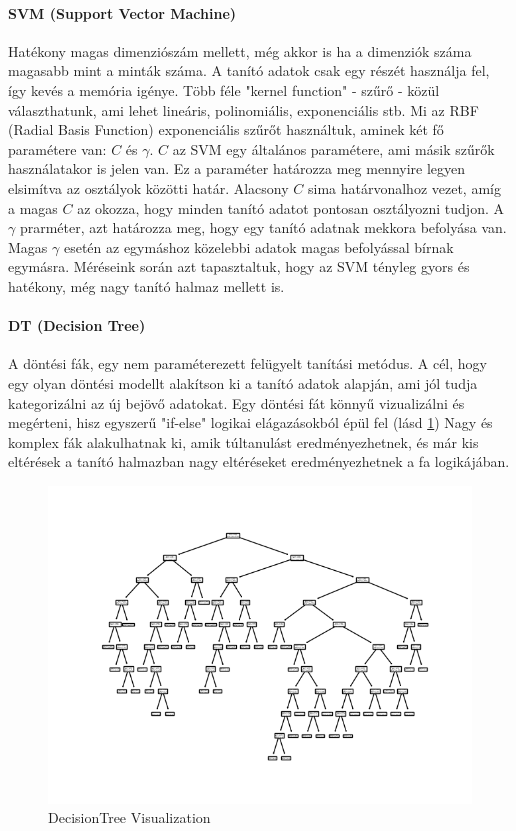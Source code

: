 \documentclass[acmtog, authorversion]{acmart}
\begin{document}
\paragraph{SVM (Support Vector Machine)} Hatékony magas dimenziószám mellett, még akkor is ha a dimenziók száma magasabb mint a minták száma. A tanító adatok
csak egy részét használja fel, így kevés a memória igénye. Több féle "kernel function" - szűrő - közül választhatunk, ami lehet lineáris, polinomiális, exponenciális stb.
Mi az RBF (Radial Basis Function) exponenciális szűrőt használtuk, aminek két fő paramétere van: $C$ és $\gamma$. $C$ az SVM egy általános paramétere,
ami másik szűrők használatakor is jelen van. Ez a paraméter határozza meg mennyire legyen elsimítva az osztályok közötti határ. Alacsony $C$ sima határvonalhoz vezet,
amíg a magas $C$ az okozza, hogy minden tanító adatot pontosan osztályozni tudjon. A $\gamma$ prarméter, azt határozza meg, hogy egy tanító adatnak mekkora befolyása van.
Magas $\gamma$ esetén az egymáshoz közelebbi adatok magas befolyással bírnak egymásra. Méréseink során azt tapasztaltuk, hogy az SVM tényleg gyors és hatékony,
még nagy tanító halmaz mellett is.

\paragraph{DT (Decision Tree)} A döntési fák, egy nem paraméterezett felügyelt tanítási metódus. A cél, hogy egy olyan döntési modellt alakítson ki a tanító adatok alapján,
ami jól tudja kategorizálni az új bejövő adatokat. Egy döntési fát könnyű vizualizálni és megérteni, hisz egyszerű "if-else" logikai elágazásokból épül fel (lásd \ref{DTVis})
Nagy és komplex fák alakulhatnak ki, amik túltanulást eredményezhetnek, és már kis eltérések a tanító halmazban nagy eltéréseket eredményezhetnek a fa logikájában.

\begin{figure}
    \includegraphics[width=1\columnwidth]{visualization/bellevue_eastgate_DT_2.png}
    \caption{DecisionTree Visualization}
    \label{DTVis}
\end{figure}
\end{document}
